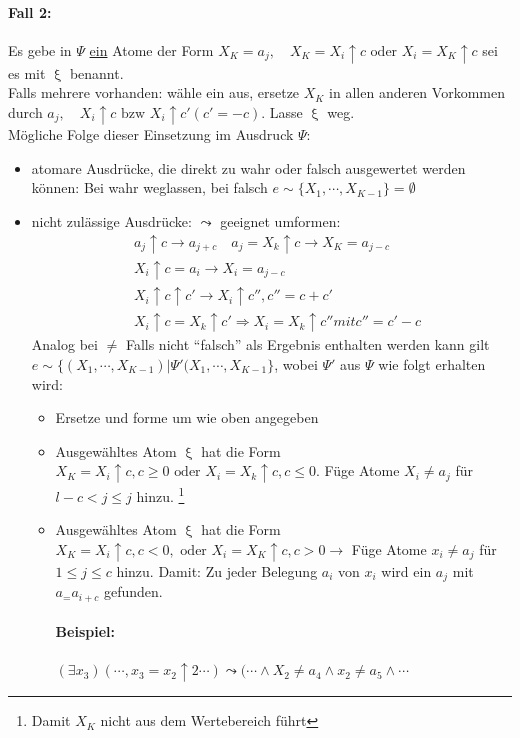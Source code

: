 \documentclass[12pt, a4paper]{article}
\begin{document}
\paragraph{Fall 2:} Es gebe in $\Psi$ \underline{ein} Atome der Form $X_K = a_j, \quad X_K = X_i \uparrow c \text{ oder } X_i = X_K \uparrow c$ sei es mit $\upxi$ benannt. \\
Falls mehrere vorhanden: wähle ein aus, ersetze $X_K$ in allen anderen Vorkommen durch $a_j, \quad X_i \uparrow c \text{ bzw } X_i \uparrow c' (c' = -c)$. Lasse $\upxi$ weg. \\
Mögliche Folge dieser Einsetzung im Ausdruck $\Psi$:
\begin{itemize}
\item atomare Ausdrücke, die direkt zu wahr oder falsch ausgewertet werden können: Bei wahr weglassen, bei falsch $e \sim \{ X_1, \cdots, X_{K - 1} \} = \emptyset$
\item nicht zulässige Ausdrücke: $\leadsto$ geeignet umformen: \\
\begin{align*}
&a_j \uparrow c \rightarrow a_{j+c} \quad a_j = X_k \uparrow c \rightarrow X_K = a_{j - c} \\
&X_i \uparrow c = a_i \rightarrow X_i = a_{j - c} \\
& X_i \uparrow c \uparrow c' \rightarrow X_i \uparrow c'', c'' = c + c' \\
& X_i \uparrow c = X_k \uparrow c' \Rightarrow X_i = X_k \uparrow c'' mit c'' = c' - c 
\end{align*}
Analog bei $\neq$
Falls nicht ``falsch'' als Ergebnis enthalten werden kann gilt $e \sim \{ (X_1, \cdots, X_{K - 1}) | \Psi'(X_1, \cdots, X_{K - 1} \}$, wobei $\Psi'$ aus $\Psi$ wie folgt erhalten wird:
\begin{itemize}
\item Ersetze und forme um wie oben angegeben
\item Ausgewähltes Atom $\upxi$ hat die Form $X_K = X_i \uparrow c, c \ge 0 \text{ oder } X_i = X_k \uparrow c, c \le 0$. Füge Atome $X_i \neq a_j$ für $l-c < j \le j$ hinzu. \footnote{Damit $X_K$ nicht aus dem Wertebereich führt}
\item Ausgewähltes Atom $\upxi$ hat die Form $X_K = X_i \uparrow c, c < 0, \text{ oder } X_i = X_K \uparrow c, c > 0 \rightarrow$ Füge Atome $x_i \neq a_j$ für $1 \le j \le c$ hinzu. Damit: Zu jeder Belegung $a_i$ von $x_i$ wird ein $a_j$ mit $a_ = a_{i + c}$ gefunden.
\paragraph{Beispiel:} $(\exists x_3)(\cdots, x_3 = x_2 \uparrow 2 \cdots) \leadsto (\cdots \wedge X_2 \neq a_4 \wedge x_2 \neq a_5 \wedge \cdots$
\end{itemize}
\end{itemize}
\end{document}
